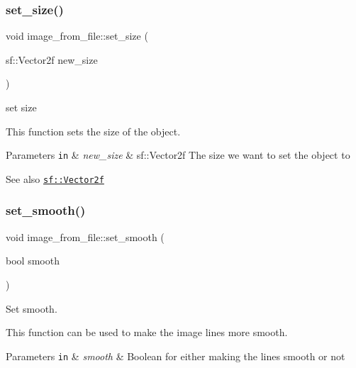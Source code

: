 \subsubsection{\texorpdfstring{set\+\_\+size()}{set\_size()}}
{\footnotesize\ttfamily void image\+\_\+from\+\_\+file\+::set\+\_\+size (\begin{DoxyParamCaption}\item[{sf\+::\+Vector2f}]{new\+\_\+size }\end{DoxyParamCaption})}



set size 

This function sets the size of the object.


\begin{DoxyParams}[1]{Parameters}
\mbox{\tt in}  & {\em new\+\_\+size} & sf\+::\+Vector2f The size we want to set the object to \\
\hline
\end{DoxyParams}
\begin{DoxySeeAlso}{See also}
\href{https://www.sfml-dev.org/documentation/2.0/classsf_1_1Vector2.php }{\tt sf\+::\+Vector2f} 
\end{DoxySeeAlso}
\mbox{\label{classimage__from__file_a2d808924e71e3eaf18532d9b32e40f07}} 
\subsubsection{\texorpdfstring{set\+\_\+smooth()}{set\_smooth()}}
{\footnotesize\ttfamily void image\+\_\+from\+\_\+file\+::set\+\_\+smooth (\begin{DoxyParamCaption}\item[{bool}]{smooth }\end{DoxyParamCaption})}



Set smooth. 

This function can be used to make the image lines more smooth.


\begin{DoxyParams}[1]{Parameters}
\mbox{\tt in}  & {\em smooth} & Boolean for either making the lines smooth or not \\
\hline
\end{DoxyParams}
\mbox{\label{classimage__from__file_a6561a7e8833e4ca84ba5a31e98802757}} 
